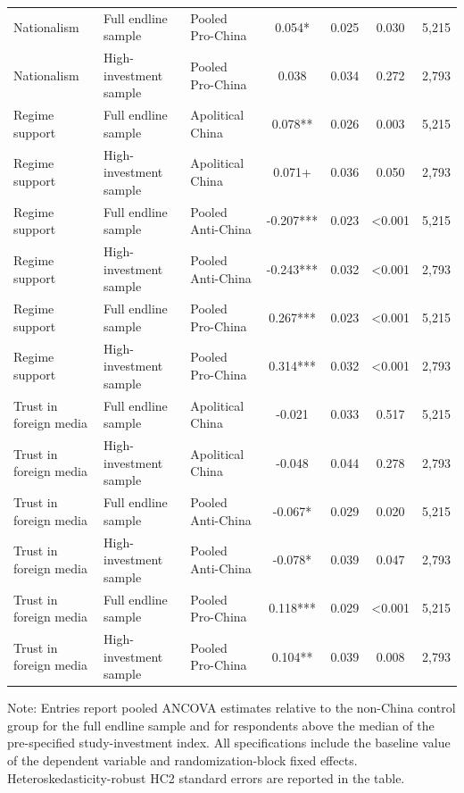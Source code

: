 \begin{table}[H]
\begin{threeparttable}
\begin{tabular}{lllcccc}
Nationalism & Full endline sample & Pooled Pro-China & 0.054* & 0.025 & 0.030 & 5,215 \\
Nationalism & High-investment sample & Pooled Pro-China & 0.038 & 0.034 & 0.272 & 2,793 \\
Regime support & Full endline sample & Apolitical China & 0.078** & 0.026 & 0.003 & 5,215 \\
Regime support & High-investment sample & Apolitical China & 0.071+ & 0.036 & 0.050 & 2,793 \\
Regime support & Full endline sample & Pooled Anti-China & -0.207*** & 0.023 & <0.001 & 5,215 \\
Regime support & High-investment sample & Pooled Anti-China & -0.243*** & 0.032 & <0.001 & 2,793 \\
Regime support & Full endline sample & Pooled Pro-China & 0.267*** & 0.023 & <0.001 & 5,215 \\
Regime support & High-investment sample & Pooled Pro-China & 0.314*** & 0.032 & <0.001 & 2,793 \\
Trust in foreign media & Full endline sample & Apolitical China & -0.021 & 0.033 & 0.517 & 5,215 \\
Trust in foreign media & High-investment sample & Apolitical China & -0.048 & 0.044 & 0.278 & 2,793 \\
Trust in foreign media & Full endline sample & Pooled Anti-China & -0.067* & 0.029 & 0.020 & 5,215 \\
Trust in foreign media & High-investment sample & Pooled Anti-China & -0.078* & 0.039 & 0.047 & 2,793 \\
Trust in foreign media & Full endline sample & Pooled Pro-China & 0.118*** & 0.029 & <0.001 & 5,215 \\
Trust in foreign media & High-investment sample & Pooled Pro-China & 0.104** & 0.039 & 0.008 & 2,793 \\
\bottomrule
\end{tabular}
\begin{tablenotes}[flushleft]
\footnotesize
\item Note: Entries report pooled ANCOVA estimates relative to the non-China control group for the full endline sample and for respondents above the median of the pre-specified study-investment index. All specifications include the baseline value of the dependent variable and randomization-block fixed effects. Heteroskedasticity-robust HC2 standard errors are reported in the table.
\end{tablenotes}
\end{threeparttable}
\end{table}
